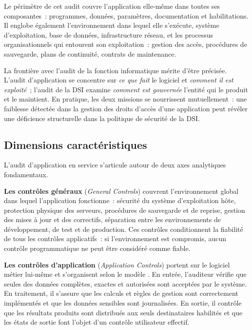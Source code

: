 Le périmètre de cet audit couvre l'application elle-même dans toutes ses
composantes~: programmes, données, paramètres, documentation et habilitations.
Il englobe également l'environnement dans lequel elle s'exécute, système
d'exploitation, base de données, infrastructure réseau, et les processus
organisationnels qui entourent son exploitation~: gestion des accès, procédures
de sauvegarde, plans de continuité, contrats de maintenance.

La frontière avec l'audit de la fonction informatique mérite d'être précisée.
L'audit d'application se concentre sur \textit{ce que fait} le logiciel et
\textit{comment il est exploité}~; l'audit de la DSI examine \textit{comment est
gouvernée} l'entité qui le produit et le maintient. En pratique, les deux missions
se nourrissent mutuellement~: une faiblesse détectée dans la gestion des droits
d'accès d'une application peut révéler une déficience structurelle dans la politique
de sécurité de la DSI.

\subsection{Dimensions caractéristiques}

L'audit d'application en service s'articule autour de deux axes analytiques
fondamentaux.

\textbf{Les contrôles généraux} (\textit{General Controls}) couvrent l'environnement
global dans lequel l'application fonctionne~: sécurité du système d'exploitation hôte,
protection physique des serveurs, procédures de sauvegarde et de reprise, gestion
des mises à jour et des correctifs, séparation entre les environnements de
développement, de test et de production. Ces contrôles conditionnent la fiabilité
de tous les contrôles applicatifs~: si l'environnement est compromis, aucun contrôle
programmatique ne peut être considéré comme fiable.

\textbf{Les contrôles d'application} (\textit{Application Controls}) portent sur
le logiciel métier lui-même et s'organisent selon le modèle . En entrée, l'auditeur vérifie que seules des données complètes,
exactes et autorisées sont acceptées par le système. En traitement, il s'assure que
les calculs et règles de gestion sont correctement implémentés et que les données
sensibles sont journalisées. En sortie, il contrôle que les résultats produits sont
distribués aux seuls destinataires habilités et que les états de sortie font l'objet
d'un contrôle utilisateur effectif.

